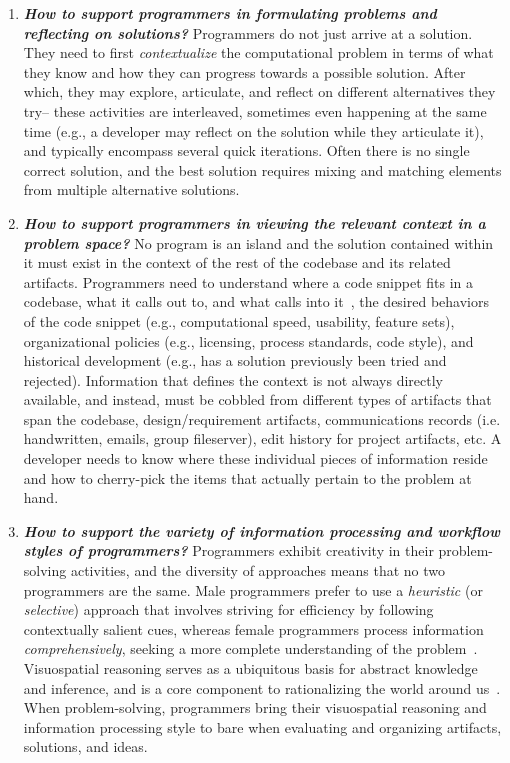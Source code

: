 \documentclass{ppig}
\begin{document}
\begin{enumerate}
	\item \textit{\textbf{How to support programmers in formulating problems and reflecting on solutions?}}
	Programmers do not just arrive at a solution.
	They need to first \textit{contextualize} the computational problem in terms of what they know and how they can progress towards a possible solution.
	After which, they may explore, articulate, and reflect on different alternatives they try-- these activities are interleaved, sometimes even happening at the same time (e.g., a developer may reflect on the solution while they articulate it), and typically encompass several quick iterations.
	Often there is no single correct solution, and the best solution requires mixing and matching elements from multiple alternative solutions.
    
    \item \textit{\textbf{How to support programmers in viewing the relevant context in a problem space?}}
    No program is an island and the solution contained within it must exist in the context of the rest of the codebase and its related artifacts.
    Programmers need to understand where a code snippet fits in a codebase, what it calls out to, and what calls into it~\cite{desouza2008empirical}, the desired behaviors of the code snippet (e.g., computational speed, usability, feature sets), organizational policies (e.g., licensing, process standards, code style), and historical development (e.g., has a solution previously been tried and rejected).
    Information that defines the context is not always directly available, and instead, must be cobbled from different types of artifacts that span the codebase, design/requirement artifacts, communications records (i.e. handwritten, emails, group fileserver), edit history for project artifacts, etc.
    A developer needs to know where these individual pieces of information reside and how to cherry-pick the items that actually pertain to the problem at hand.
    
 	\item \textit{\textbf{How to support the variety of information processing and workflow styles of programmers?}}
 	Programmers exhibit creativity in their problem-solving activities, and the diversity of approaches means that no two programmers are the same.
 	Male programmers prefer to use a \textit{heuristic} (or \textit{selective}) approach that involves striving for efficiency by following contextually salient cues, whereas female programmers process information \textit{comprehensively}, seeking a more complete understanding of the problem~\cite{grigoreanu2012end}.
 	Visuospatial reasoning serves as a ubiquitous basis for abstract knowledge and inference, and is a core component to rationalizing the world around us~\cite{tversky2005visuospatial}.
 	When problem-solving, programmers bring their visuospatial reasoning and information processing style to bare when evaluating and organizing artifacts, solutions, and ideas.
  

\end{enumerate}
\end{document}
